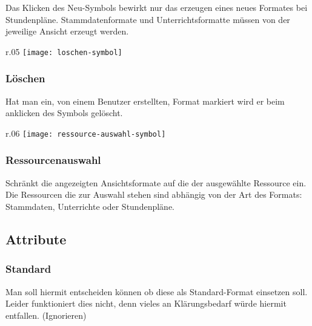 \noindent
Das Klicken des Neu-Symbols bewirkt nur das erzeugen eines neues Formates bei Stundenpläne. Stammdatenformate und Unterrichtsformatte müssen von der jeweilige Ansicht erzeugt werden.\\

\begin{wrapfigure}{r}{.05\textwidth}
	\vspace{-25pt}
	\texttt{[image: loschen-symbol]}
	\vspace{-35pt}
\end{wrapfigure}

\subsubsection{Löschen}

\vspace{10pt}

\noindent
Hat man ein, von einem Benutzer erstellten, Format markiert wird er beim anklicken des Symbols gelöscht.\\

\begin{wrapfigure}{r}{.06\textwidth}
	\vspace{-25pt}
	\texttt{[image: ressource-auswahl-symbol]}
	\vspace{-35pt}
\end{wrapfigure}

\subsubsection{Ressourcenauswahl}

\vspace{10pt}

\noindent
Schränkt die angezeigten Ansichtsformate auf die der ausgewählte Ressource ein. Die Ressourcen die zur Auswahl stehen sind abhängig von der Art des Formats: Stammdaten, Unterrichte oder Stundenpläne.\\ 

\subsection{Attribute}

\subsubsection{Standard}
Man soll hiermit entscheiden können ob diese als Standard-Format einsetzen soll. Leider funktioniert dies nicht, denn vieles an Klärungsbedarf würde hiermit entfallen. (Ignorieren)


